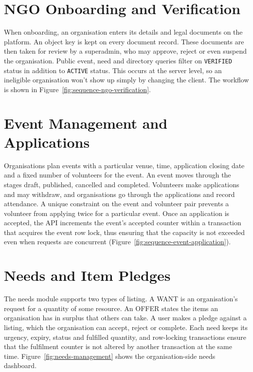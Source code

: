 \section{NGO Onboarding and Verification}
\label{sec:impl-verification}
When onboarding, an organisation enters its details and legal documents on the platform. An object key is kept on every document record. These documents are then taken for review by a superadmin, who may approve, reject or even suspend the organisation. Public event, need and directory queries filter on \texttt{VERIFIED} status in addition to \texttt{ACTIVE} status. This occurs at the server level, so an ineligible organisation won't show up simply by changing the client. The workflow is shown in Figure~\ref{fig:sequence-ngo-verification}.


\section{Event Management and Applications}
\label{sec:impl-events}
Organisations plan events with a particular venue, time, application closing date and a fixed number of volunteers for the event. An event moves through the stages draft, published, cancelled and completed. Volunteers make applications and may withdraw, and organisations go through the applications and record attendance. A unique constraint on the event and volunteer pair prevents a volunteer from applying twice for a particular event. Once an application is accepted, the API increments the event's accepted counter within a transaction that acquires the event row lock, thus ensuring that the capacity is not exceeded even when requests are concurrent (Figure~\ref{fig:sequence-event-application}).


\section{Needs and Item Pledges}
\label{sec:impl-needs}
The needs module supports two types of listing. A WANT is an organisation's request for a quantity of some resource. An OFFER states the items an organisation has in surplus that others can take. A user makes a pledge against a listing, which the organisation can accept, reject or complete. Each need keeps its urgency, expiry, status and fulfilled quantity, and row-locking transactions ensure that the fulfilment counter is not altered by another transaction at the same time. Figure~\ref{fig:needs-management} shows the organisation-side needs dashboard.


